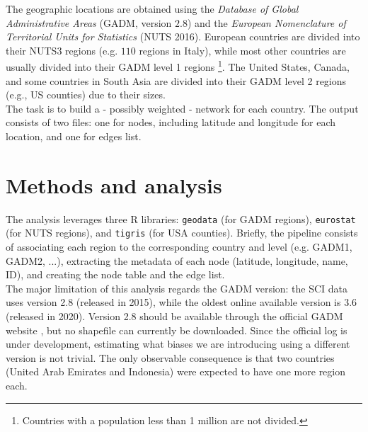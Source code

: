 The geographic locations are obtained using the \textit{Database of Global
Administrative Areas} (GADM, version $2.8$) and the \textit{European Nomenclature of Territorial Units for Statistics} (NUTS 2016). European countries are divided into their NUTS3 regions (e.g. $110$ regions in Italy), while most other countries are usually divided into their GADM level 1 regions \footnote{Countries with a population less than 1 million are not divided.}. The United States, Canada, and some countries in South Asia are divided into their
GADM level 2 regions (e.g., US counties) due to their sizes. \\
The task is to build a - possibly weighted - network for each country. The output consists of two files: one for nodes, including latitude and longitude for each location, and one for edges list. 

\section{Methods and analysis}
The analysis leverages three R libraries: \texttt{geodata} \cite{geodata} (for GADM regions), \texttt{eurostat} \cite{eurostat} (for NUTS regions), and \texttt{tigris} \cite{tigris} (for USA counties). Briefly, the pipeline consists of associating each region to the corresponding country and level (e.g. GADM1, GADM2, ...), extracting the metadata of each node (latitude, longitude, name, ID), and creating the node table and the edge list. \\
The major limitation of this analysis regards the GADM version: the SCI data uses version 2.8 (released in 2015), while the oldest online available version is 3.6 (released in 2020). Version 2.8 should be available through the official GADM website \cite{GADM}, but no shapefile can currently be downloaded. Since the official log is under development, estimating what biases we are introducing using a different version is not trivial. The only observable consequence is that two countries (United Arab Emirates and Indonesia) were expected to have one more region each. 

